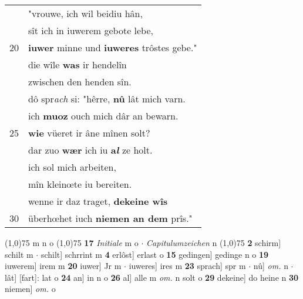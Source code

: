 \documentclass[8pt,a4paper,notitlepage]{article}
\begin{document}
\begin{table}[ht]
\begin{minipage}[t]{0.5\linewidth}
\begin{tabular}{rl}
 & "vrouwe, ich wil beidiu hân,\\ 
 & sît ich in iuwerem gebote lebe,\\ 
20 & \textbf{iuwer} minne und \textbf{iuweres} trôstes gebe."\\ 
 & die wîle \textbf{was} ir hendelîn\\ 
 & zwischen den henden sîn.\\ 
 & dô spr\textit{ach} si: "hêrre, \textbf{nû} lât mich varn.\\ 
 & ich \textbf{muoz} ouch mich dâr an bewarn.\\ 
25 & \textbf{wie} vüeret ir âne mînen solt?\\ 
 & dar zuo \textbf{wær} ich iu \textbf{a\textit{l}} ze holt.\\ 
 & ich sol mich arbeiten,\\ 
 & mîn kleinœte iu bereiten.\\ 
 & wenne ir daz traget, \textbf{dekeine wîs}\\ 
30 & überhœhet iuch \textbf{niemen an dem} prîs."\\ 
\end{tabular}
\scriptsize
\line(1,0){75} \newline
m n o \newline
\line(1,0){75} \newline
\textbf{17} \textit{Initiale} m o   $\cdot$ \textit{Capitulumzeichen} n  \newline
\line(1,0){75} \newline
\textbf{2} schirm] schilt m  $\cdot$ schilt] schrrint m \textbf{4} erlôst] erlast o \textbf{15} gedingen] gedinge n o \textbf{19} iuwerem] irem m \textbf{20} iuwer] Jr m  $\cdot$ iuweres] ires m \textbf{23} sprach] spr m  $\cdot$ nû] \textit{om.} n  $\cdot$ lât] [fart]: lat o \textbf{24} an] in n o \textbf{26} al] alle m \textit{om.} n solt o \textbf{29} dekeine] do heine n \textbf{30} niemen] \textit{om.} o \newline
\end{minipage}
\end{table}
\newpage
\end{document}
